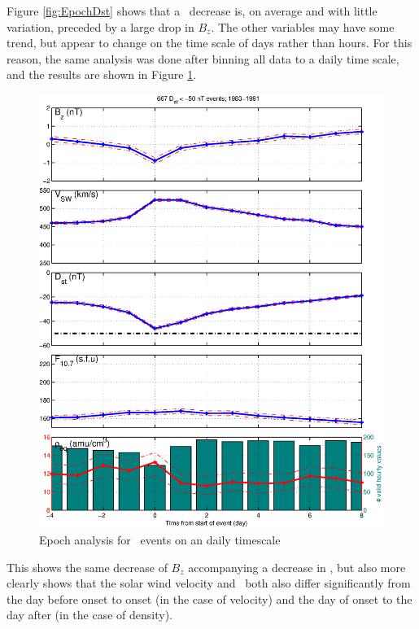Figure \ref{fig:EpochDst} shows that a \dst\ decrease is, on average and with little variation, preceded by a large drop in $B_z$. The other variables may have some trend, but appear to change on the time scale of days rather than hours. For this reason, the same analysis was done after binning all data to a daily time scale, and the results are shown in Figure \ref{fig:EpochDstDay}.

\begin{figure}[htp!]
	\centering
	\includegraphics[width=1\linewidth]{Figures/StormAvs/stormavs-dst-day-GOES6}
	\caption{Epoch analysis for \dst\ events on an daily timescale}
	\label{fig:EpochDstDay}
\end{figure}

This shows the same decrease of $B_z$ accompanying a decrease in \dst, but also more clearly shows that the solar wind velocity and \req\ both also differ significantly from the day before onset to onset (in the case of velocity) and the day of onset to the day after (in the case of density). 

